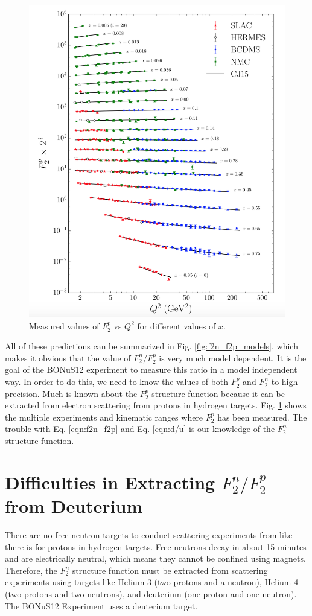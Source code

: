 \begin{figure}[h!]
 	\centering
 	\includegraphics[width=0.9\linewidth]{figures/F2p.png}
 	\caption{Measured values of $F_2^p$ vs $Q^2$ for different values of $x$. \cite{CJ15}}
 	\label{fig:f2p}
 \end{figure}
 
All of these predictions can be summarized in Fig. \ref{fig:f2n_f2p_models}, which makes it obvious that the value of $F_2^n/F_2^p$ is very much model dependent. It is the goal of the BONuS12 experiment to measure this ratio in a model independent way. In order to do this, we need to know the values of both $F_2^p$ and $F_2^n$ to high precision. Much is known about the $F_2^p$ structure function because it can be extracted from electron scattering from protons in hydrogen targets. Fig. \ref{fig:f2p} shows the multiple experiments and kinematic ranges where $F_2^p$ has been measured. The trouble with Eq. \ref{eqn:f2n_f2p} and Eq. \ref{eqn:d/u} is our knowledge of the $F_2^n$ structure function.

\section{Difficulties in Extracting $F_2^n/F_2^p$ from Deuterium}
There are no free neutron targets to conduct scattering experiments from like there is for protons in hydrogen targets. Free neutrons decay in about 15 minutes and are electrically neutral, which means they cannot be confined using magnets. Therefore, the $F_2^n$ structure function must be extracted from scattering experiments using targets like Helium-3 (two protons and a neutron), Helium-4 (two protons and two neutrons), and deuterium (one proton and one neutron). The BONuS12 Experiment uses a deuterium target.

